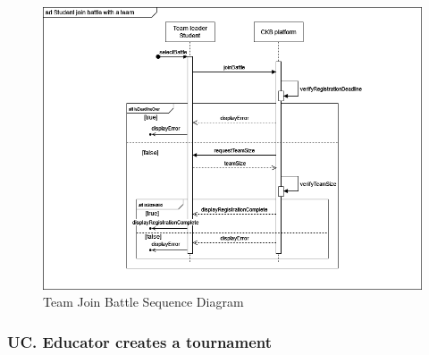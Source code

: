 \begin{center}
    \begin{figure} [H]
        \begin{center}
            \includegraphics[width=0.9\linewidth]{Images/SequenceDiagrams/SD_9.png}
            \caption{Team Join Battle Sequence Diagram}
            \label{fig: team_join_battle_seq_diag}
        \end{center}
    \end{figure}
\end{center}

\subsubsection*{UC\cuc . Educator creates a tournament}

